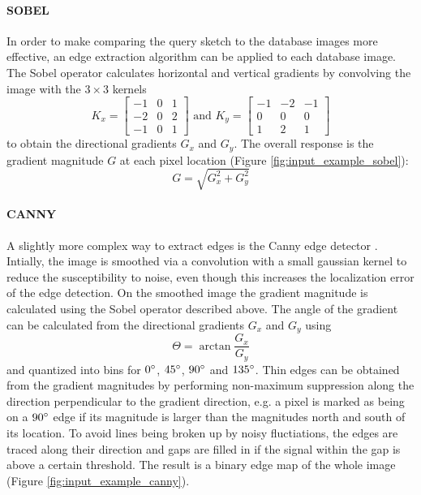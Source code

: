 \paragraph{SOBEL}

In order to make comparing the query sketch to the database images more
effective, an edge extraction algorithm can be applied to each database image.
The Sobel operator calculates horizontal and vertical gradients by convolving
the image with the $3 \times 3$ kernels
\begin{equation*}
    K_x =
    \begin{bmatrix}
        -1 & 0 & 1 \\
        -2 & 0 & 2 \\
        -1 & 0 & 1
    \end{bmatrix}
    \text{ and }
    K_y =
    \begin{bmatrix}
        -1 & -2 & -1 \\
         0 &  0 &  0 \\
         1 &  2 &  1
    \end{bmatrix}
\end{equation*}
to obtain the directional gradients $G_x$ and $G_y$. The overall response is
the gradient magnitude $G$ at each pixel location (Figure
\ref{fig:input_example_sobel}):
\begin{equation*}
    G = \sqrt{G_x^2 + G_y^2}
\end{equation*}

\paragraph{CANNY}

A slightly more complex way to extract edges is the Canny edge detector
\autocite{canny_computational_1986}. Intially, the image is smoothed via a
convolution with a small gaussian kernel to reduce the susceptibility to noise,
even though this increases the localization error of the edge detection. On the
smoothed image the gradient magnitude is calculated using the Sobel operator
described above. The angle of the gradient can be calculated from the
directional gradients $G_x$ and $G_y$ using
\begin{equation*}
    \Theta = \arctan{\frac{G_x}{G_y}}
\end{equation*}
and quantized into bins for $0 \degree$, $45 \degree$, $90 \degree$ and $135
\degree$. Thin edges can be obtained from the gradient magnitudes by performing
non-maximum suppression along the direction perpendicular to the gradient
direction, e.g. a pixel is marked as being on a $90 \degree$ edge if its
magnitude is larger than the magnitudes north and south of its location. To
avoid lines being broken up by noisy fluctiations, the edges are traced along
their direction and gaps are filled in if the signal within the gap is above a
certain threshold. The result is a binary edge map of the whole image (Figure
\ref{fig:input_example_canny}).

